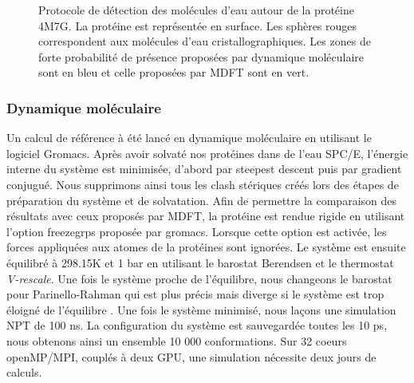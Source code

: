 \begin{figure}[H]
      \caption{Protocole de détection des molécules d'eau autour de la protéine 4M7G. La protéine est représentée en surface. Les sphères rouges correspondent aux molécules d'eau cristallographiques. Les zones de forte probabilité de présence proposées par dynamique moléculaire sont en bleu et celle proposées par MDFT sont en vert.}
      \label{fig:water_molecule_protocol}
\end{figure}




\subsubsection{Dynamique moléculaire}
Un calcul de référence à été lancé en dynamique moléculaire en utilisant le logiciel Gromacs\cite{berendsen_gromacs:_1995}. Après avoir solvaté nos protéines dans de l'eau SPC/E, l'énergie interne du système est minimisée, d'abord par steepest descent puis par gradient conjugué. Nous supprimons ainsi tous les clash stériques créés lors des étapes de préparation du système et de solvatation. Afin de permettre la comparaison des résultats avec ceux proposés par MDFT, la protéine est rendue rigide en utilisant l'option freezegrps proposée par gromacs. Lorsque cette option est activée, les forces appliquées aux atomes de la protéines sont ignorées. Le système est ensuite équilibré à 298.15K et 1 bar en utilisant le barostat Berendsen et le thermostat \textit{V-rescale}. Une fois le système proche de l'équilibre, nous changeons le barostat pour Parinello-Rahman qui est plus précis mais diverge si le système est trop éloigné de l'équilibre . Une fois le système minimisé, nous laçons une simulation NPT de 100 ns. La configuration du système est sauvegardée toutes les 10 ps, nous obtenons ainsi un ensemble 10 000 conformations. Sur 32 coeurs openMP/MPI, couplés à deux GPU, une simulation nécessite deux jours de calculs.

